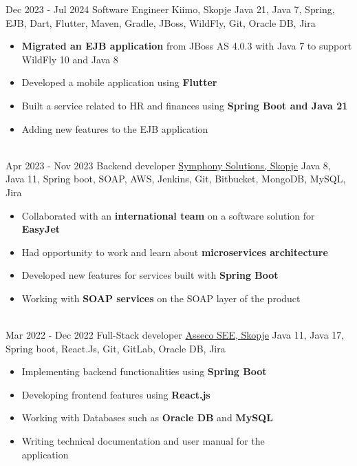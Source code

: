 \documentclass[letterpaper]{twentysecondcv} %
\begin{document}
\begin{twenty} %
	\twentyitem
    		{Dec 2023 -}
            {Jul 2024}
        		{Software Engineer}
        		{Kiimo, Skopje}
        		{Java 21, Java 7, Spring, EJB, Dart, Flutter, Maven, Gradle, JBoss, WildFly, Git, Oracle DB, Jira}
        		{\begin{itemize}
        			\item \textbf{Migrated an EJB application} from JBoss AS 4.0.3 with Java 7 to support WildFly 10 and Java 8
                    \item Developed a mobile application using \textbf{Flutter}
        			\item Built a service related to HR and finances using \textbf{Spring Boot and Java 21}
        			\item Adding new features to the EJB application
                    
        		\end{itemize}}\\
     	\twentyitem
    		{Apr 2023 -}
		{Nov 2023}
        		{Backend developer}
        		{\href{https://symphony-solutions.com/}{Symphony Solutions, Skopje}}
        		{Java 8, Java 11, Spring boot, SOAP, AWS, Jenkins, Git, Bitbucket, MongoDB, MySQL, Jira}
        		{\begin{itemize}
        			\item Collaborated with an \textbf{international team} on a software solution for \textbf{EasyJet}
                    \item Had opportunity to work and learn about \textbf{microservices architecture}
                    \item  Developed new features for services built with \textbf{Spring Boot}
        			\item Working with \textbf{SOAP services} on the SOAP layer of the product
        		\end{itemize}}\\
     	\twentyitem
    		{Mar 2022 -}
		{Dec 2022}
        		{Full-Stack developer}
        		{\href{https://see.asseco.com/}{Asseco SEE, Skopje}}
        		{Java 11, Java 17, Spring boot, React.Js, Git, GitLab, Oracle DB, Jira}
        		{\begin{itemize}
        			\item Implementing backend functionalities using \textbf{Spring Boot}
        			\item Developing frontend features using \textbf{React.js}
        			\item Working with Databases such as \textbf{Oracle DB} and \textbf{MySQL}
        			\item Writing technical documentation and user manual for the\vspace{1mm}\\ application
        		\end{itemize}}\\
\end{twenty}
\end{document}
